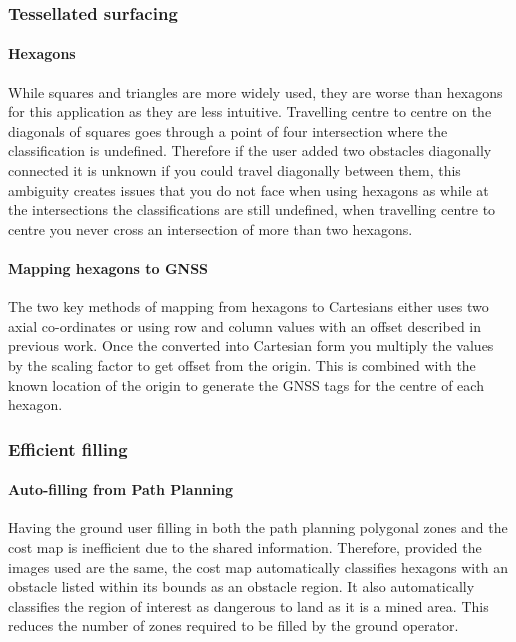 \subsubsection{Tessellated surfacing}\label{sub_sub_section:tgt_hexagons}
\paragraph{Hexagons} While squares and triangles are more widely used, they are worse than hexagons for this application as they are less intuitive. Travelling centre to centre on the diagonals of squares goes through a point of four intersection where the classification is undefined. Therefore if the user added two obstacles diagonally connected it is unknown if you could travel diagonally between them, this ambiguity creates issues that you do not face when using hexagons as while at the intersections the classifications are still undefined, when travelling centre to centre you never cross an intersection of more than two hexagons.
\paragraph{Mapping hexagons to \gls{GNSS}} \label{para:Mapping hexagons}
The two key methods of mapping from hexagons to Cartesians either uses two axial co-ordinates or using row and column values with an offset described in previous work\cite{MappingHexagons}. Once the converted into Cartesian form you multiply the values by the scaling factor to get offset from the origin. This is combined with the known location of the origin to generate the \gls{GNSS} tags for the centre of each hexagon.

\subsubsection{Efficient filling}\label{sub_sub_section:tgt_filling}
\paragraph{Auto-filling from Path Planning}
Having the ground user filling in both the path planning polygonal zones and the cost map is inefficient due to the shared information. Therefore, provided the images used are the same, the cost map automatically classifies hexagons with an obstacle listed within its bounds as an obstacle region. It also automatically classifies the region of interest as dangerous to land as it is a mined area. This reduces the number of zones required to be filled by the ground operator. 
